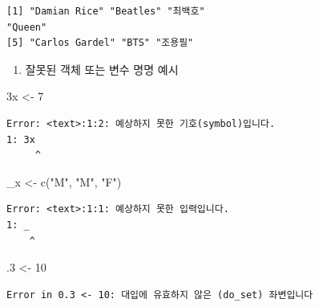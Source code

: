 \documentclass[
  11pt,
]{krantz}
\newenvironment{Shaded}{\begin{snugshade}}{\end{snugshade}}
\newcommand{\DecValTok}[1]{\textcolor[rgb]{0.06,0.06,0.06}{#1}}
\newcommand{\FunctionTok}[1]{\textcolor[rgb]{0,0,0}{#1}}
\newcommand{\NormalTok}[1]{#1}
\newcommand{\OtherTok}[1]{\textcolor[rgb]{0.37,0.37,0.37}{#1}}
\newcommand{\StringTok}[1]{\textcolor[rgb]{0.5,0.5,0.5}{#1}}
\providecommand{\tightlist}{%
  \setlength{\itemsep}{0pt}\setlength{\parskip}{0pt}}
\begin{document}
\begin{verbatim}
[1] "Damian Rice" "Beatles" "최백호"
"Queen"
[5] "Carlos Gardel" "BTS" "조용필"
\end{verbatim}

\normalsize

\begin{enumerate}
\def\labelenumi{\arabic{enumi}.}
\setcounter{enumi}{2}
\tightlist
\item
  잘못된 객체 또는 변수 명명 예시
\end{enumerate}

\footnotesize

\begin{Shaded}
\begin{Highlighting}[]
\NormalTok{3x }\OtherTok{\textless{}{-}} \DecValTok{7}
\end{Highlighting}
\end{Shaded}

\begin{verbatim}
Error: <text>:1:2: 예상하지 못한 기호(symbol)입니다.
1: 3x
     ^
\end{verbatim}

\normalsize

\footnotesize

\begin{Shaded}
\begin{Highlighting}[]
\NormalTok{\_x }\OtherTok{\textless{}{-}} \FunctionTok{c}\NormalTok{(}\StringTok{"M"}\NormalTok{, }\StringTok{"M"}\NormalTok{, }\StringTok{"F"}\NormalTok{)}
\end{Highlighting}
\end{Shaded}

\begin{verbatim}
Error: <text>:1:1: 예상하지 못한 입력입니다.
1: _
    ^
\end{verbatim}

\normalsize

\footnotesize

\begin{Shaded}
\begin{Highlighting}[]
\NormalTok{.}\DecValTok{3} \OtherTok{\textless{}{-}} \DecValTok{10}
\end{Highlighting}
\end{Shaded}

\begin{verbatim}
Error in 0.3 <- 10: 대입에 유효하지 않은 (do_set) 좌변입니다
\end{verbatim}

\normalsize
\end{document}
